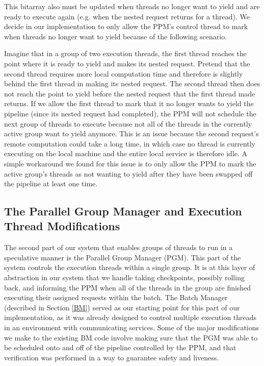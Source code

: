 \documentclass[11pt, oneside]{report}
\begin{document}
This bitarray also must be updated when threads no longer want to yield and are ready to execute again (e.g. when the nested request returns for a thread). 
We decide in our implementation to only allow the PPM's control thread to mark when threads no longer want to yield because of the following scenario. 

Imagine that in a group of two execution threads, the first thread reaches the point where it is ready to yield and makes its nested request.
Pretend that the second thread requires more local computation time and therefore is slightly behind the first thread in making its nested request.
The second thread then does not reach the point to yield before the nested request that the first thread made returns.
If we allow the first thread to mark that it no longer wants to yield the pipeline (since its nested request had completed), the PPM will not schedule the next group of threads to execute because not all of the threads in the currently active group want to yield anymore.
This is an issue because the second request's remote computation could take a long time, in which case no thread is currently executing on the local machine and the entire local service is therefore idle.
A simple workaround we found for this issue is to only allow the PPM to mark the active group's threads as not wanting to yield after they have been swapped off the pipeline at least one time.

\subsection{The Parallel Group Manager and Execution Thread Modifications}

The second part of our system that enables groups of threads to run in a speculative manner is the Parallel Group Manager (PGM).
This part of the system controls the execution threads within a single group.
It is at this layer of abstraction in our system that we handle taking checkpoints, possibly rolling back, and informing the PPM when all of the threads in the group are finished executing their assigned requests within the batch.
The Batch Manager (described in Section \ref{BM}) served as our starting point for this part of our implementation, as it was already designed to control multiple execution threads in an environment with communicating services.
Some of the major modifications we make to the existing BM code involve making sure that the PGM was able to be scheduled onto and off of the pipeline controlled by the PPM, and that verification was performed in a way to guarantee safety and liveness. 
\end{document}
